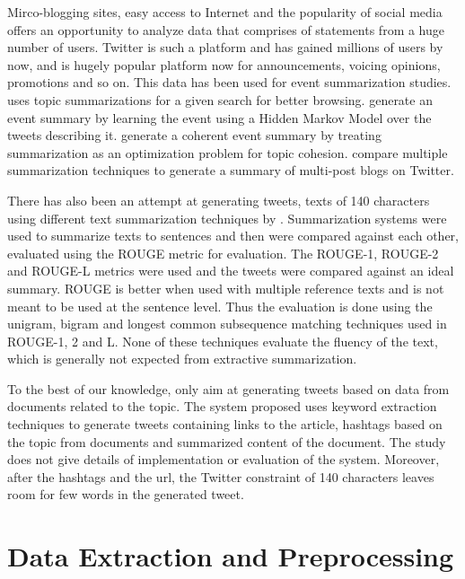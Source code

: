 \documentclass[11pt]{article}
\begin{document}
Mirco-blogging sites, easy access to Internet and the popularity of social media offers an opportunity to analyze data that comprises of statements from a huge number of users. Twitter is such a platform and has gained millions of users by now, and is hugely popular platform now for announcements, voicing opinions, promotions and so on. This data has been used for event summarization studies.  uses topic summarizations for a given search for better browsing.  generate an event summary by learning the event using a Hidden Markov Model over the tweets describing it.  generate a coherent event summary by treating summarization as an optimization problem for topic cohesion.  compare multiple summarization techniques to generate a summary of multi-post blogs on Twitter.

There has also been an attempt at generating tweets, texts of 140 characters using different text summarization techniques by  . Summarization systems were used to summarize texts to sentences and then were compared against each other, evaluated using the ROUGE metric for evaluation. The ROUGE-1, ROUGE-2 and ROUGE-L metrics were used and the tweets were compared against an ideal summary. ROUGE is better when used with multiple reference texts and is not meant to be used at the sentence level. Thus the evaluation is done using the unigram, bigram and longest common subsequence matching techniques used in ROUGE-1, 2 and L. None of these techniques evaluate the fluency of the text, which is generally not expected from extractive summarization. 

To the best of our knowledge, only  aim at generating tweets based on data from documents related to the topic. The system proposed uses keyword extraction techniques to generate tweets containing links to the article, hashtags based on the topic from documents and summarized content of the document. The study does not give details of implementation or evaluation of the system. Moreover, after the hashtags and the url, the Twitter constraint of 140 characters leaves room for few words in the generated tweet.


\section{Data Extraction and Preprocessing}
\end{document}
